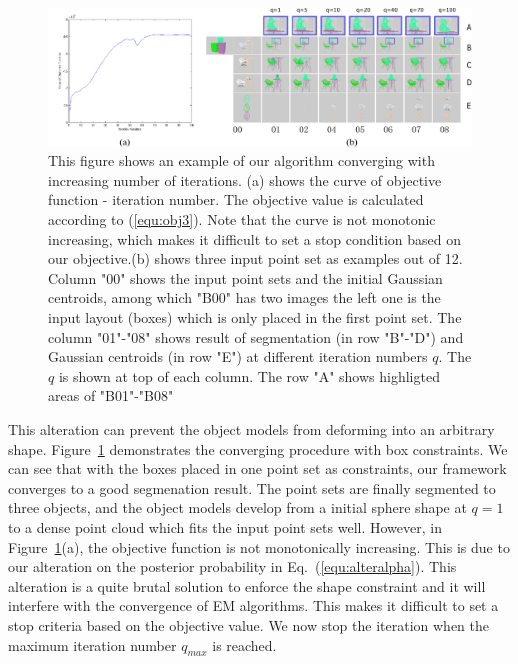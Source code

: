 \begin{figure}
	\centering
	\includegraphics[width=\linewidth]{images/Initialization/iters_merge}
	\caption{\label{fig:iter} This figure shows an example of our algorithm converging with increasing number of iterations.
		(a) shows the curve of objective function - iteration number. The objective value is calculated according to (\ref{equ:obj3}). Note that the curve is not monotonic increasing, which makes it difficult to set a stop condition based on our objective.(b) shows three input point set as examples out of 12. Column "00" shows the input point sets and the initial Gaussian centroids, among which "B00" has two images the left one  is the input layout (boxes) which is only placed in the first point set. The column "01"-"08" shows result of segmentation (in row "B"-"D") and Gaussian centroids (in row "E") at different iteration numbers $q$. The $q$ is shown at top of each column. The row "A" shows highligted areas of "B01"-"B08" }
\end{figure}

This alteration can prevent the object models from deforming into an arbitrary shape.
%
%
Figure~\ref{fig:iter} demonstrates the converging procedure with box constraints. 
%
We can see that with the boxes placed in one point set as constraints, our framework converges to a good segmenation result. The point sets are finally segmented to three objects, and the object models develop from a initial sphere shape at $q=1$ to a dense point cloud which fits the input point sets well. 
%
However, in Figure~\ref{fig:iter}(a), the objective function is not monotonically increasing. 
This is due to our alteration on the posterior probability in Eq.~(\ref{equ:alteralpha}). This alteration is a quite brutal solution to enforce the shape constraint and it will interfere with the convergence of EM algorithms.
% 
This makes it difficult to set a stop criteria based on the objective value. 
We now stop the iteration when the maximum iteration number $q_{max}$ is reached.
 
